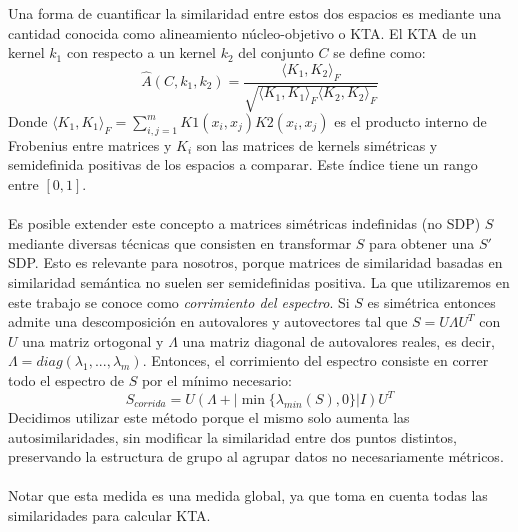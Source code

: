 Una forma de cuantificar la similaridad entre estos dos espacios es mediante una cantidad conocida como alineamiento núcleo-objetivo o KTA. El KTA de un kernel $k_1$ con respecto a un kernel $k_2$ del conjunto $C$ se define como:
\begin{equation}
	\hat{A}(C, k_1, k_2) = \frac{\langle K_1, K_2 \rangle _F}{\sqrt{\langle K_1, K_1 \rangle _F \langle K_2, K_2 \rangle _F}}
\end{equation}
Donde $\langle K_1, K_1 \rangle _F = \sum_{i,j=1}^m K1(x_i, x_j)K2(x_i, x_j)$ es el producto interno de Frobenius entre matrices y $K_i$ son las matrices de kernels simétricas y semidefinida positivas de los espacios a comparar. Este índice tiene un rango entre $[0, 1]$.\cite{Cristianini2006}\\\\
Es posible extender este concepto a matrices simétricas indefinidas (no SDP) $S$ mediante diversas técnicas que consisten en transformar $S$ para obtener una $S'$ SDP. Esto es relevante para nosotros, porque matrices de similaridad basadas en similaridad semántica no suelen ser semidefinidas positiva. La que utilizaremos en este trabajo se conoce como \textit{corrimiento del espectro}. Si $S$ es simétrica entonces admite una descomposición en autovalores y autovectores tal que $S=U\Lambda U^T$ con $U$ una matriz ortogonal y $\Lambda$ una matriz diagonal de autovalores reales, es decir, $\Lambda = diag(\lambda _1,...,\lambda _m)$. Entonces, el corrimiento del espectro consiste en correr todo el espectro de $S$ por el mínimo necesario: 
\begin{equation}
	S_{corrida} = U(\Lambda + |\min\{\lambda _{min}(S), 0\}|I)U^T 
	\label{eq:matriz_corrida}
\end{equation}
Decidimos utilizar este método porque el mismo solo aumenta las autosimilaridades, sin modificar la similaridad entre dos puntos distintos, preservando la estructura de grupo al agrupar datos no necesariamente métricos.\cite{Chen22009}\\\\
Notar que esta medida es una medida global, ya que toma en cuenta todas las similaridades para calcular KTA.\\\\
